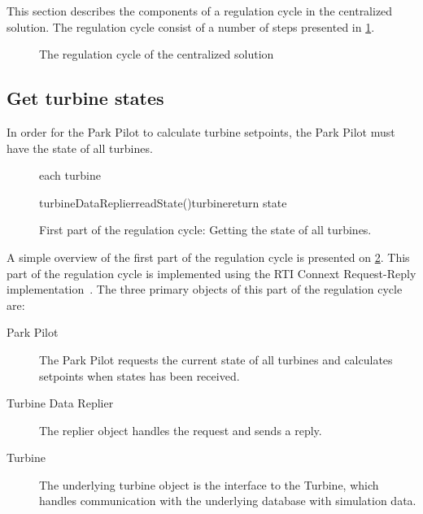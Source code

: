 This section describes the components of a regulation cycle in the centralized solution. The regulation cycle consist of a number of steps presented in \cref{fig:timingCentral}.

\begin{figure}[!h]
	
	\caption{The regulation cycle of the centralized solution}
	\label{fig:timingCentral}
\end{figure}

\subsection{Get turbine states}\label{sec:getTurbineStates}

In order for the Park Pilot to calculate turbine setpoints, the Park Pilot must have the state of all turbines.

\begin{figure}
	\centering
	\begin{sequencediagram} %
	
		\begin{sdblock}{each turbine}{}
			\begin {call}{turbineDataReplier}{readState()}{turbine}{return state}
			\end {call}
		\end{sdblock}				
	\end{sequencediagram}

	\caption[First part of the regulation cycle]{
		\label{fig:getStatesOfTurbines} 
		\footnotesize{%
			First part of the regulation cycle: Getting the state of all turbines.
		}
	}
\end{figure}

A simple overview of the first part of the regulation cycle is presented on \cref{fig:getStatesOfTurbines}. This part of the regulation cycle is implemented using the RTI Connext Request-Reply implementation~\cite{rtiConnextUsersManual}. The three primary objects of this part of the regulation cycle are:

\begin{description}
	\item [Park Pilot] The Park Pilot requests the current state of all turbines and calculates setpoints when states has been received.
	\item [Turbine Data Replier] The replier object handles the request and sends a reply.
	\item [Turbine] The underlying turbine object is the interface to the Turbine, which handles communication with the underlying database with simulation data.
\end{description}


